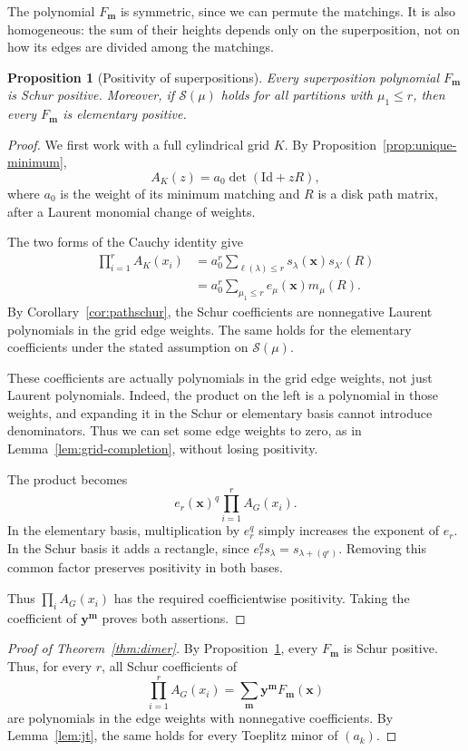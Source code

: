 \documentclass[11pt]{article}
\newtheorem{proposition}[theorem]{Proposition}
\theoremstyle{definition}
\theoremstyle{remark}
\newcommand{\xx}{\mathbf x}
\newcommand{\yy}{\mathbf y}
\newcommand{\mm}{\mathbf m}
\begin{document}
The polynomial $F_{\mm}$ is symmetric, since
we can permute the matchings. It is also
homogeneous: the sum of their heights depends
only on the superposition, not on how its edges
are divided among the matchings.

\begin{proposition}[Positivity of superpositions]
\label{prop:schur}
Every superposition polynomial $F_{\mm}$
is Schur positive. Moreover, if
$\mathcal S(\mu)$ holds for all partitions
with $\mu_1\le r$, then every $F_{\mm}$
is elementary positive.
\end{proposition}

\begin{proof}
We first work with a full cylindrical grid $K$.
By Proposition~\ref{prop:unique-minimum},
\[
A_K(z)=a_0\det(\mathrm{Id}+zR),
\]
where $a_0$ is the weight of its minimum
matching and $R$ is a disk path matrix,
after a Laurent monomial change of weights.

The two forms of the Cauchy identity give
\[
\begin{aligned}
\prod_{i=1}^r A_K(x_i)
 &=a_0^r\sum_{\ell(\lambda)\le r}
   s_\lambda(\xx)s_{\lambda'}(R)\\
 &=a_0^r\sum_{\mu_1\le r}
   e_\mu(\xx)m_\mu(R).
\end{aligned}
\]
By Corollary~\ref{cor:pathschur}, the Schur
coefficients are nonnegative Laurent
polynomials in the grid edge weights.
The same holds for the elementary coefficients
under the stated assumption on $\mathcal S(\mu)$.


These coefficients are actually polynomials in
the grid edge weights, not just Laurent polynomials.
Indeed, the product on the left is a polynomial
in those weights, and expanding it in the Schur
or elementary basis cannot introduce denominators.
Thus we can set some edge weights to zero, as in
Lemma~\ref{lem:grid-completion}, without losing
positivity.

The product becomes
\[
e_r(\xx)^q\prod_{i=1}^r A_G(x_i).
\]
In the elementary basis, multiplication by
$e_r^q$ simply increases the exponent of $e_r$.
In the Schur basis it adds a rectangle, since
$e_r^qs_\lambda=s_{\lambda+(q^r)}$.
Removing this common factor preserves positivity
in both bases.

Thus $\prod_i A_G(x_i)$ has the required
coefficientwise positivity. Taking the
coefficient of $\yy^{\mm}$ proves both assertions.
\end{proof}


\begin{proof}[Proof of Theorem~\ref{thm:dimer}]
By Proposition~\ref{prop:schur}, every
$F_{\mm}$ is Schur positive. Thus, for every $r$,
all Schur coefficients of
\[
\prod_{i=1}^r A_G(x_i)
=\sum_{\mm}\yy^{\mm}F_{\mm}(\xx)
\]
are polynomials in the edge weights with
nonnegative coefficients. By
Lemma~\ref{lem:jt}, the same holds for every
Toeplitz minor of $(a_k)$.
\end{proof}
\end{document}

